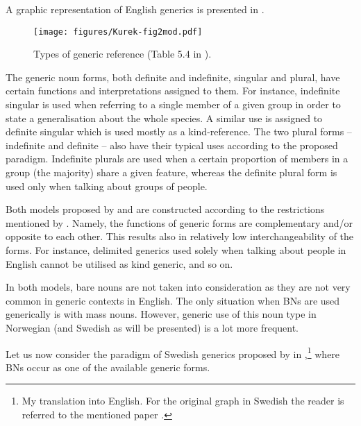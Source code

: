\documentclass[output=paper]{langsci/langscibook}
\begin{document}
A graphic representation of English generics is presented in .

\begin{figure}
	\caption{Types of generic reference (Table 5.4 in \citealt[111]{Radden2007}).\label{fig:types-radden2007}}
	\texttt{[image: figures/Kurek-fig2mod.pdf]}
\end{figure}

The generic noun forms, both definite and indefinite, singular and plural, have certain functions and interpretations assigned to them. For instance, indefinite singular is used when referring to a single member of a given group in order to state a generalisation about the whole species. A similar use is assigned to definite singular which is used mostly as a kind-reference. The two plural forms -- indefinite and definite -- also have their typical uses according to the proposed paradigm. Indefinite plurals are used when a certain proportion of members in a group (the majority) share a given feature, whereas the definite plural form is used only when talking about groups of people.

Both models proposed by \citet{Radden2007} and \citet{Radden2009} are constructed according to the restrictions mentioned by \citet{Lehmann2015}. Namely, the functions of generic forms are complementary and/or opposite to each other. This results also in relatively low interchangeability of the forms. For instance, delimited generics used solely when talking about people in English cannot be utilised as kind generic, and so on.

In both models, bare nouns are not taken into consideration as they are not very common in generic contexts in English. The only situation when BNs are used generically is with mass nouns. However, generic use of this noun type in Norwegian (and Swedish as will be presented) is a lot more frequent.

Let us now consider the paradigm of Swedish generics proposed by \citet{Pettersson1976} in ,\footnote{My translation into English. For the original graph in Swedish the reader is referred to the mentioned paper \citep[121]{Pettersson1976}.} where BNs occur as one of the available generic forms.
\end{document}
